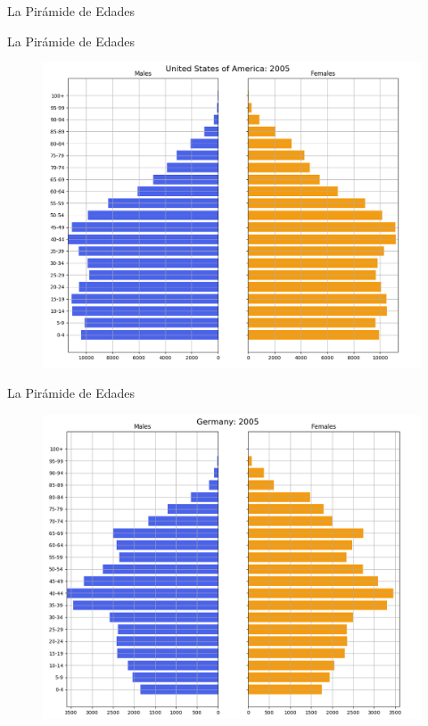 \documentclass[8pt,a4paper]{beamer}
\begin{document}
{\begin{frame}{La Pirámide de Edades}
\end{frame}

\begin{frame}{La Pirámide de Edades}

\begin{figure}[hbtp]
\centering
\includegraphics[scale=0.30]{2.png}
\label{fig:3}
\end{figure}

\end{frame}

\begin{frame}{La Pirámide de Edades}

\begin{figure}[hbtp]
\centering
\includegraphics[scale=0.30]{3.png}
\label{fig:4}
\end{figure}


\end{frame}}
\end{document}
